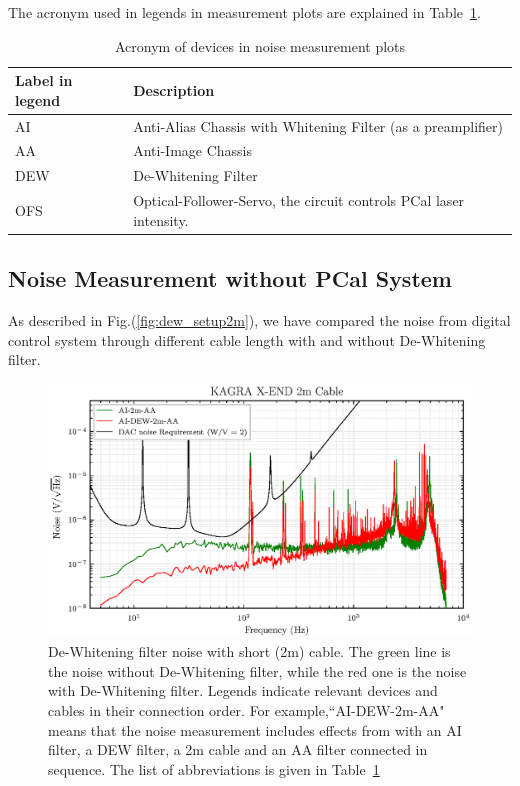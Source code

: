 \pagebreak

The acronym used in legends in measurement plots are explained in Table~\ref{tab:acronym_legend}. \\


\begin{table}[hbt!]
\centering
\begin{tabular}{ll}
\hline
Label in legend  & Description        \\
\hline
AI      & Anti-Alias  Chassis with Whitening Filter (as a preamplifier) \\
AA      & Anti-Image  Chassis   \\
DEW     & De-Whitening Filter   \\
OFS     & Optical-Follower-Servo, the circuit controls PCal laser intensity.\\
\hline
\end{tabular}
\caption{Acronym of devices in noise measurement plots}
\label{tab:acronym_legend}
\end{table}



\pagebreak
\subsection{Noise Measurement without PCal System}

As described in Fig.(\ref{fig:dew_setup2m}), we have compared the noise from digital control system through different cable length with and without De-Whitening filter.

\begin{figure}[hbt!]
\centering
\includegraphics[width=1\textwidth]{figure/noise/00_2m}
\caption[De-Whitening filter noise with short cable]{ De-Whitening filter noise with short (2m) cable. The green line is the noise without De-Whitening filter, while the red one is the noise with De-Whitening filter. Legends indicate relevant devices and cables in their connection order. For example,``AI-DEW-2m-AA" means that the noise measurement includes effects from with an AI filter, a DEW filter, a 2m cable and an AA filter connected in sequence. The list of abbreviations is given in Table~\ref{tab:acronym_legend}  }
\label{fig:00_2m}
\end{figure}

